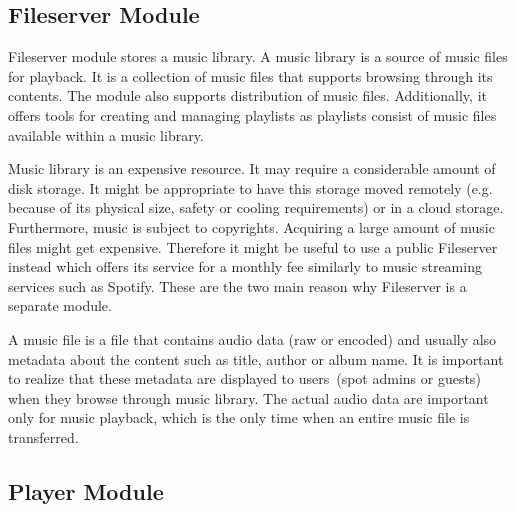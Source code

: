 \subsection{Fileserver Module}

Fileserver module stores a music library. A music library is a source of music files for playback. It is a collection of music files that supports browsing through its contents. The module also supports distribution of music files. Additionally, it offers tools for creating and managing playlists as playlists consist of music files available within a music library.
\par
Music library is an expensive resource. It may require a considerable amount of disk storage. It might be appropriate to have this storage moved remotely (e.g. because of its physical size, safety or cooling requirements) or in a cloud storage. Furthermore, music is subject to copyrights. Acquiring a large amount of music files might get expensive. Therefore it might be useful to use a public Fileserver instead which offers its service for a monthly fee similarly to music streaming services such as Spotify. These are the two main reason why Fileserver is a separate module.
\par
A music file is a file that contains audio data (raw or encoded) and usually also metadata about the content such as title, author or album name. It is important to realize that these metadata are displayed to users~(spot admins or guests) when they browse through music library. The actual audio data are important only for music playback, which is the only time when an entire music file is transferred.

\subsection{Player Module}

